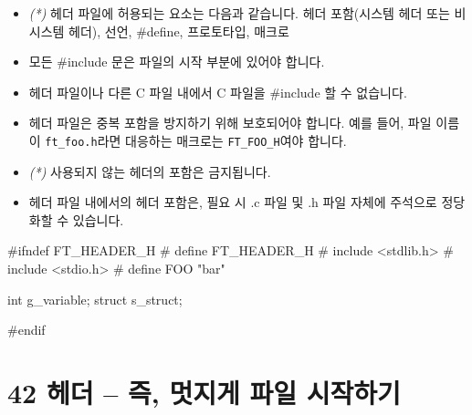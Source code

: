 \documentclass{42-ko}
\begin{document}
        \begin{itemize}

            \item \textit{(*)} 헤더 파일에 허용되는 요소는 다음과 같습니다.
              헤더 포함(시스템 헤더 또는 비 시스템 헤더), 선언, \#define,
              프로토타입, 매크로

            \item 모든 \#include 문은 파일의 시작 부분에 있어야 합니다.

            \item 헤더 파일이나 다른 C 파일 내에서 C 파일을 \#include 할 수 없습니다.

            \item 헤더 파일은 중복 포함을 방지하기 위해 보호되어야 합니다.
              예를 들어, 파일 이름이 \texttt{ft\_foo.h}라면 대응하는 매크로는
              \texttt{FT\_FOO\_H}여야 합니다.

            \item \textit{(*)} 사용되지 않는 헤더의 포함은 금지됩니다.

            \item 헤더 파일 내에서의 헤더 포함은, 필요 시 .c 파일 및 .h 파일 자체에
              주석으로 정당화할 수 있습니다.

        \end{itemize}

\vspace{1cm}

        \begin{42ccode}
#ifndef FT_HEADER_H
# define FT_HEADER_H
# include <stdlib.h>
# include <stdio.h>
# define FOO "bar"

int		  g_variable;
struct	s_struct;

#endif
        \end{42ccode}
        \newpage



   \section{42 헤더 – 즉, 멋지게 파일 시작하기}
\end{document}
